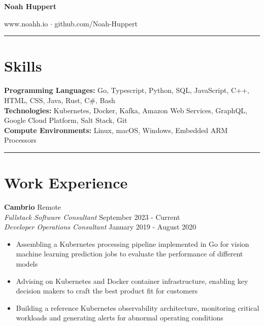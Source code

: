 \documentclass[10pt]{article}
\begin{document}

\centering
	{\huge\textbf{Noah Huppert}}
	\vspace{1ex}

	
	www.noahh.io $\cdot$ github.com/Noah-Huppert

	\rule{\columnwidth}{1pt}

\begin{flushleft}

\section{Skills}
\textbf{Programming Languages:} Go, Typescript, Python, SQL, JavaScript, C++, HTML, CSS, Java, Rust, C\#, Bash \\ %
	\textbf{Technologies:} Kubernetes, Docker, Kafka, Amazon Web Services, GraphQL, Google Cloud Platform, Salt Stack, Git \\
	\textbf{Compute Environments:} Linux, macOS, Windows, Embedded ARM Processors

	\rule{\columnwidth}{0.4pt}

\section{Work Experience}
	\textbf{Cambrio} \hfill Remote \\
	\textit{Fullstack Software Consultant} \hfill September 2023 - Current  \\
	\textit{Developer Operations Consultant} \hfill January 2019 - August 2020  \\
	\begin{itemize}
		\item Assembling a Kubernetes processing pipeline implemented in Go for vision machine learning prediction jobs to evaluate the performance of different models

		\item Advising on Kubernetes and Docker container infrastructure, enabling key decision makers to craft the best product fit for customers

		\item Building a reference Kubernetes observability architecture, monitoring critical workloads and generating alerts for abnormal operating conditions
	\end{itemize}


\end{flushleft}
\end{document}
